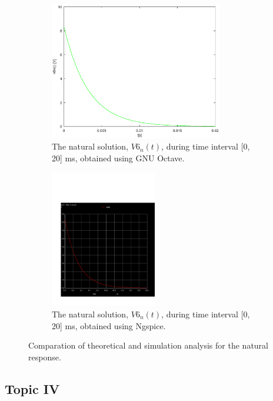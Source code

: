 \begin{figure}[H]

\begin{subfigure}{0.5\textwidth}
\includegraphics[width=0.9\linewidth, height=6cm]{natural.eps} 
\caption{The natural solution, $V6_n(t)$, during time interval [0, 20] ms, obtained using GNU Octave.}
\label{fig:theo_third}
\end{subfigure}
\begin{subfigure}{0.5\textwidth}
\includegraphics[width=0.9\linewidth, height=6cm]{trans1.pdf}
\caption{The natural solution, $V6_n(t)$, during time interval [0, 20] ms, obtained using Ngspice.}
\label{fig:natural}
\end{subfigure}

\caption{Comparation of theoretical and simulation analysis for the natural response.}
\label{fig:compar_1}
\end{figure}


\subsection{Topic IV}
\label{subsec:fourth_topic_error}

